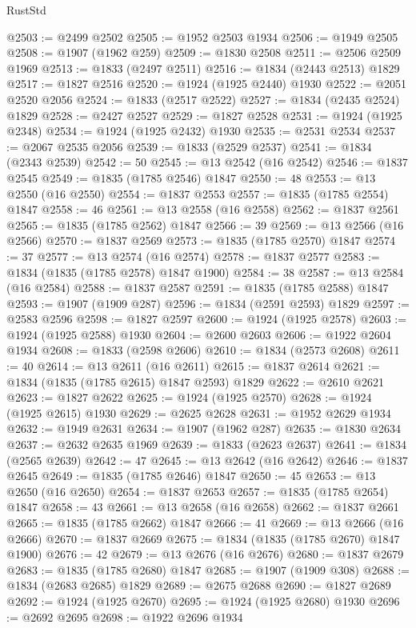 \begin{lexlean}{RustStd}
\begin{coremodule}
{\begin{coremodule}
{{{{{@2503 := @2499 @2502
@2505 := @1952 @2503 @1934
@2506 := @1949 @2505
@2508 := @1907 (@1962 @259)
@2509 := @1830 @2508
@2511 := @2506 @2509 @1969
@2513 := @1833 (@2497 @2511)
@2516 := @1834 (@2443 @2513) @1829
@2517 := @1827 @2516
@2520 := @1924 (@1925 @2440) @1930
@2522 := @2051 @2520 @2056
@2524 := @1833 (@2517 @2522)
@2527 := @1834 (@2435 @2524) @1829
@2528 := @2427 @2527
@2529 := @1827 @2528
@2531 := @1924 (@1925 @2348)
@2534 := @1924 (@1925 @2432) @1930
@2535 := @2531 @2534
@2537 := @2067 @2535 @2056
@2539 := @1833 (@2529 @2537)
@2541 := @1834 (@2343 @2539)
@2542 := 50
@2545 := @13 @2542 (@16 @2542)
@2546 := @1837 @2545
@2549 := @1835 (@1785 @2546) @1847
@2550 := 48
@2553 := @13 @2550 (@16 @2550)
@2554 := @1837 @2553
@2557 := @1835 (@1785 @2554) @1847
@2558 := 46
@2561 := @13 @2558 (@16 @2558)
@2562 := @1837 @2561
@2565 := @1835 (@1785 @2562) @1847
@2566 := 39
@2569 := @13 @2566 (@16 @2566)
@2570 := @1837 @2569
@2573 := @1835 (@1785 @2570) @1847
@2574 := 37
@2577 := @13 @2574 (@16 @2574)
@2578 := @1837 @2577
@2583 := @1834 (@1835 (@1785 @2578) @1847 @1900)
@2584 := 38
@2587 := @13 @2584 (@16 @2584)
@2588 := @1837 @2587
@2591 := @1835 (@1785 @2588) @1847
@2593 := @1907 (@1909 @287)
@2596 := @1834 (@2591 @2593) @1829
@2597 := @2583 @2596
@2598 := @1827 @2597
@2600 := @1924 (@1925 @2578)
@2603 := @1924 (@1925 @2588) @1930
@2604 := @2600 @2603
@2606 := @1922 @2604 @1934
@2608 := @1833 (@2598 @2606)
@2610 := @1834 (@2573 @2608)
@2611 := 40
@2614 := @13 @2611 (@16 @2611)
@2615 := @1837 @2614
@2621 := @1834 (@1835 (@1785 @2615) @1847 @2593) @1829
@2622 := @2610 @2621
@2623 := @1827 @2622
@2625 := @1924 (@1925 @2570)
@2628 := @1924 (@1925 @2615) @1930
@2629 := @2625 @2628
@2631 := @1952 @2629 @1934
@2632 := @1949 @2631
@2634 := @1907 (@1962 @287)
@2635 := @1830 @2634
@2637 := @2632 @2635 @1969
@2639 := @1833 (@2623 @2637)
@2641 := @1834 (@2565 @2639)
@2642 := 47
@2645 := @13 @2642 (@16 @2642)
@2646 := @1837 @2645
@2649 := @1835 (@1785 @2646) @1847
@2650 := 45
@2653 := @13 @2650 (@16 @2650)
@2654 := @1837 @2653
@2657 := @1835 (@1785 @2654) @1847
@2658 := 43
@2661 := @13 @2658 (@16 @2658)
@2662 := @1837 @2661
@2665 := @1835 (@1785 @2662) @1847
@2666 := 41
@2669 := @13 @2666 (@16 @2666)
@2670 := @1837 @2669
@2675 := @1834 (@1835 (@1785 @2670) @1847 @1900)
@2676 := 42
@2679 := @13 @2676 (@16 @2676)
@2680 := @1837 @2679
@2683 := @1835 (@1785 @2680) @1847
@2685 := @1907 (@1909 @308)
@2688 := @1834 (@2683 @2685) @1829
@2689 := @2675 @2688
@2690 := @1827 @2689
@2692 := @1924 (@1925 @2670)
@2695 := @1924 (@1925 @2680) @1930
@2696 := @2692 @2695
@2698 := @1922 @2696 @1934
}}}}}
\end{coremodule}}
\end{coremodule}
\end{lexlean}
